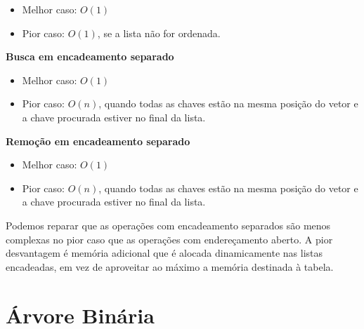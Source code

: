 \documentclass[•]{article}
\begin{document}
\begin{itemize}
				\begin{itemize}
					\item Melhor caso: $O(1)$
					\item Pior caso: $O(1)$, se a lista não for ordenada.
				\end{itemize}
				\textbf{Busca em encadeamento separado}
				\begin{itemize}
					\item Melhor caso: $O(1)$
					\item Pior caso: $O(n)$, quando todas as chaves estão na mesma posição do vetor e a chave procurada estiver no final da lista.
				\end{itemize}
				\textbf{Remoção em encadeamento separado}
				\begin{itemize}
					\item Melhor caso: $O(1)$
					\item Pior caso: $O(n)$, quando todas as chaves estão na mesma posição do vetor e a chave procurada estiver no final da lista.
				\end{itemize}				
				Podemos reparar que as operações com encadeamento separados são menos complexas no pior caso que as operações com endereçamento aberto. A pior desvantagem é memória adicional que é alocada dinamicamente nas listas encadeadas, em vez de aproveitar ao máximo a memória destinada à tabela.
			\end{itemize}
%
%	
	\section{Árvore Binária}	
\end{document}
